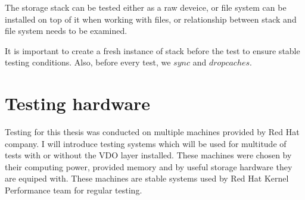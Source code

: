 \documentclass[
  color, %
  table, %
  lof,   %
  lot,   %
]{fithesis3}
\begin{document}
The storage stack can be tested either as a raw deveice, or file system can be installed on top of it when working with files, or relationship between stack and file system needs to be examined.

It is important to create a fresh instance of stack before the test to ensure stable testing conditions. Also, before every test, we $sync$ and $drop caches$. 





\section{Testing hardware}
Testing for this thesis was conducted on multiple machines provided by Red Hat company. I will introduce testing systems which will be used for multitude of tests with or without the VDO layer installed. These machines were chosen by their computing power, provided memory and by useful storage hardware they are equiped with. These machines are stable systems used by Red Hat Kernel Performance team for regular testing.

\label{machines}
\end{document}
